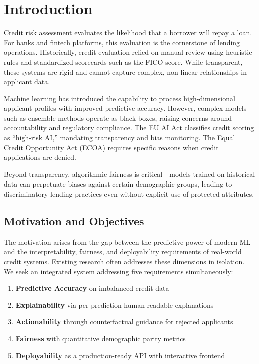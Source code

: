 \documentclass[12pt]{report}
\begin{document}
\chapter{Introduction}

Credit risk assessment evaluates the likelihood that a borrower will repay a loan. For banks and fintech platforms, this evaluation is the cornerstone of lending operations. Historically, credit evaluation relied on manual review using heuristic rules and standardized scorecards such as the FICO score. While transparent, these systems are rigid and cannot capture complex, non-linear relationships in applicant data.

Machine learning has introduced the capability to process high-dimensional applicant profiles with improved predictive accuracy. However, complex models such as ensemble methods operate as black boxes, raising concerns around accountability and regulatory compliance. The EU AI Act classifies credit scoring as ``high-risk AI,'' mandating transparency and bias monitoring. The Equal Credit Opportunity Act (ECOA) requires specific reasons when credit applications are denied.

Beyond transparency, algorithmic fairness is critical---models trained on historical data can perpetuate biases against certain demographic groups, leading to discriminatory lending practices even without explicit use of protected attributes.

\section{Motivation and Objectives}

The motivation arises from the gap between the predictive power of modern ML and the interpretability, fairness, and deployability requirements of real-world credit systems. Existing research often addresses these dimensions in isolation. We seek an integrated system addressing five requirements simultaneously:

\begin{enumerate}[nosep]
    \item \textbf{Predictive Accuracy} on imbalanced credit data
    \item \textbf{Explainability} via per-prediction human-readable explanations
    \item \textbf{Actionability} through counterfactual guidance for rejected applicants
    \item \textbf{Fairness} with quantitative demographic parity metrics
    \item \textbf{Deployability} as a production-ready API with interactive frontend
\end{enumerate}
\end{document}
